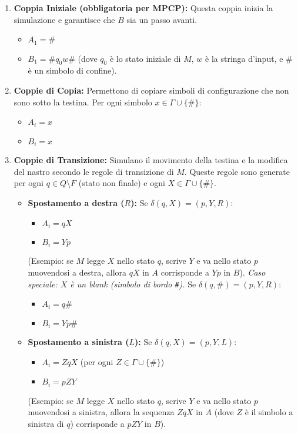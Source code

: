 \documentclass[a4paper]{article}
\theoremstyle{definition} %
\theoremstyle{remark} %
\begin{document}
\begin{enumerate}
    \item \textbf{Coppia Iniziale (obbligatoria per MPCP):}
    Questa coppia inizia la simulazione e garantisce che $B$ sia un passo avanti.
    \begin{itemize}
        \item $A_1 = \#$
        \item $B_1 = \# q_0 w \#$ (dove $q_0$ è lo stato iniziale di $M$, $w$ è la stringa d'input, e $\#$ è un simbolo di confine).
    \end{itemize}

    \item \textbf{Coppie di Copia:}
    Permettono di copiare simboli di configurazione che non sono sotto la testina.
    Per ogni simbolo $x \in \Gamma \cup \{\#\}$:
    \begin{itemize}
        \item $A_i = x$
        \item $B_i = x$
    \end{itemize}

    \item \textbf{Coppie di Transizione:}
    Simulano il movimento della testina e la modifica del nastro secondo le regole di transizione di $M$. Queste regole sono generate per ogni $q \in Q \setminus F$ (stato non finale) e ogni $X \in \Gamma \cup \{\#\}$.
    \begin{itemize}
        \item \textbf{Spostamento a destra ($R$):} Se $\delta(q, X) = (p, Y, R)$:
            \begin{itemize}
                \item $A_i = qX$
                \item $B_i = Yp$
            \end{itemize}
            (Esempio: se $M$ legge $X$ nello stato $q$, scrive $Y$ e va nello stato $p$ muovendosi a destra, allora $qX$ in $A$ corrisponde a $Yp$ in $B$).
            \emph{Caso speciale: $X$ è un blank (simbolo di bordo \texttt{\#}).} Se $\delta(q, \#) = (p, Y, R)$:
            \begin{itemize}
                \item $A_i = q\#$
                \item $B_i = Yp\#$
            \end{itemize}
        \item \textbf{Spostamento a sinistra ($L$):} Se $\delta(q, X) = (p, Y, L)$:
            \begin{itemize}
                \item $A_i = ZqX$ (per ogni $Z \in \Gamma \cup \{\#\}$)
                \item $B_i = pZY$
            \end{itemize}
            (Esempio: se $M$ legge $X$ nello stato $q$, scrive $Y$ e va nello stato $p$ muovendosi a sinistra, allora la sequenza $ZqX$ in $A$ (dove $Z$ è il simbolo a sinistra di $q$) corrisponde a $pZY$ in $B$).
    \end{itemize}


\end{enumerate}
\end{document}
